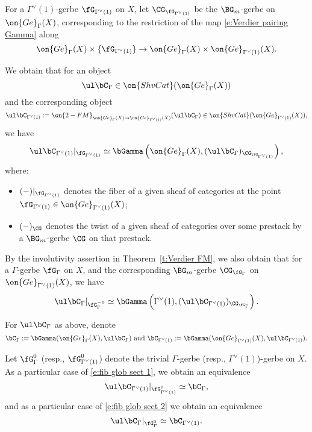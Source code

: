\documentclass[9pt]{amsart}
\theoremstyle{remark}
\theoremstyle{definition}
\theoremstyle{remark}
\newcommand{\thmref}[1]{Theorem~\ref{#1}}
\numberwithin{equation}{section}
\begin{document}
For a $\Gamma^\vee(1)$-gerbe $\fG_{\Gamma^\vee(1)}$ on $X$, let $\CG_{\fG_{\Gamma^\vee(1)}}$ be the $\BG_m$-gerbe 
on $\on{Ge}_{\Gamma}(X)$, corresponding to the restriction of the map \eqref{e:Verdier pairing Gamma} along
$$\on{Ge}_{\Gamma}(X)\times \{\fG_{\Gamma^\vee(1)}\}\to \on{Ge}_{\Gamma}(X)\times \on{Ge}_{\Gamma^\vee(1)}(X).$$

We obtain that for an object
$$\ul\bC_{\Gamma}\in \on{ShvCat}(\on{Ge}_{\Gamma}(X))$$
and the corresponding object
$$\ul\bC_{\Gamma^\vee(1)}:=\on{2-FM}_{\on{Ge}_{\Gamma}(X)\to \on{Ge}_{\Gamma^\vee(1)}(X)}(\ul\bC_{\Gamma})\in 
\on{ShvCat}(\on{Ge}_{\Gamma^\vee(1)}(X)),$$
we have
\begin{equation} \label{e:fib glob sect 1}
\ul\bC_{\Gamma^\vee(1)}|_{\fG_{\Gamma^\vee(1)}}\simeq \bGamma\left(\on{Ge}_{\Gamma}(X),(\ul\bC_{\Gamma})_{\CG_{\fG_{\Gamma^\vee(1)}}}\right),
\end{equation}
where:

\begin{itemize}

\item $(-)|_{\fG_{\Gamma^\vee(1)}}$ denotes the fiber of a given sheaf of categories at the point $\fG_{\Gamma^\vee(1)}\in \on{Ge}_{\Gamma^\vee(1)}(X)$; 

\item $(-)_\CG$ denotes the twist of a given sheaf of categories over some prestack by a $\BG_m$-gerbe $\CG$ on that prestack.

\end{itemize}

\medskip

By the involutivity assertion in \thmref{t:Verdier FM}, we also obtain that for a $\Gamma$-gerbe 
$\fG_\Gamma$ on $X$, and the corresponding $\BG_m$-gerbe $\CG_{\fG_\Gamma}$ on $\on{Ge}_{\Gamma^\vee(1)}(X)$, we have
\begin{equation} \label{e:fib glob sect 2}
\ul\bC_{\Gamma}|_{\fG^{-1}_\Gamma}\simeq \bGamma\left(\Gamma^\vee(1),(\ul\bC_{\Gamma^\vee(1)})_{\CG_{\fG_\Gamma}}\right).
\end{equation}

\sssec{}

For $\ul\bC_{\Gamma}$ as above, denote
$$\bC_\Gamma:=\bGamma(\on{Ge}_{\Gamma}(X),\ul\bC_{\Gamma}) \text{ and }
\bC_{\Gamma^\vee(1)}:=\bGamma(\on{Ge}_{\Gamma^\vee(1)}(X),\ul\bC_{\Gamma^\vee(1)}).$$

Let $\fG^0_\Gamma$ (resp., $\fG^0_{\Gamma^\vee(1)}$) denote the trivial $\Gamma$-gerbe 
(resp., $\Gamma^\vee(1)$)-gerbe on $X$. As a particular case of \eqref{e:fib glob sect 1},
we obtain an equivalence
\begin{equation} \label{e:fib glob sect neutral}
\ul\bC_{\Gamma^\vee(1)}|_{\fG^0_{\Gamma^\vee(1)}}\simeq \bC_\Gamma,
\end{equation}
and as a particular case of \eqref{e:fib glob sect 2} we obtain an equivalence
\begin{equation} \label{e:glob fib sect neutral}
\ul\bC_{\Gamma}|_{\fG^0_{\Gamma}}\simeq \bC_{\Gamma^\vee(1)}.
\end{equation}
\end{document}
